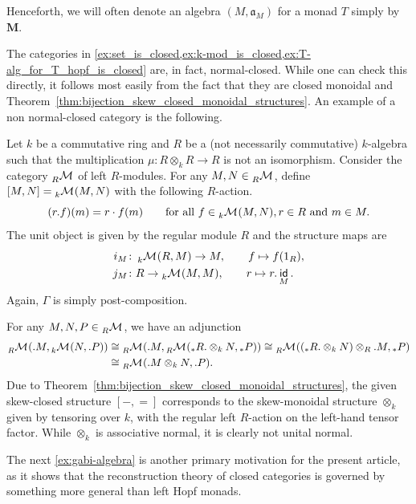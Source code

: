 \documentclass[12pt,dvipsnames,oneside]{amsart}
\theoremstyle{plain}
\theoremstyle{remark}
\theoremstyle{definition}
\DeclareMathOperator{\id}{\mathsf{id}}
\newcommand*{\from}{\colon}
\newcommand*{\blank}{{-}}
\newcommand*{\bblank}{{=}}
\newcommand{\mb}[1]{\boldsymbol{#1}}
\newcommand{\act}{\mathfrak{a}}
\begin{document}
Henceforth, we will often denote an algebra \((M,\act_M)\) for a monad \(T\) simply by \(\mb{M}\).

\smallskip

The categories in \cref{ex:set_is_closed,ex:k-mod_is_closed,ex:T-alg_for_T_hopf_is_closed} are, in fact,  normal-closed.
While one can check this directly, it follows most easily from the fact that they are closed monoidal and Theorem~\ref{thm:bijection_skew_closed_monoidal_structures}.
An example of a non normal-closed category is the following.

\begin{example}
  Let \(k\) be a commutative ring and \(R\) be a (not necessarily commutative) \(k\)-algebra such that the multiplication \(\mu\from R \otimes_k R \to R\) is not an isomorphism.
  Consider the category \(\hmodM[R]\) of left \(R\)-modules. For any \(M,N\in \hmodM[R]\), define \([M,N]=\hmodM[k](M,N)\) with the following \(R\)-action.
  \[(r.f)(m) = r \cdot f(m) \qquad \text{for all } f\in \hmodM[k](M,N), r\in R \text{ and }m\in M.\]
  The unit object is given by the regular module \(R\) and the structure maps are
  \begin{align*}
    i_M \colon & \hmodM[k](R,M)\to M, \qquad f \mapsto f(1_R), \\
    j_M\colon & R\to \hmodM[k](M,M), \qquad r \mapsto r.\id_{M}.
  \end{align*}
  Again, \(\Gamma\) is simply post-composition.

  For any \(M, N, P \in \hmodM[R]\), we have an adjunction
  \begin{align*}
    \hmodM[R](.M,\hmodM[k](N,.P))
    & \cong \hmodM[R](.M,\hmodM[R](_{*}R. \otimes_{k} N, {_{*}P}))
      \cong \hmodM[R](({_{*}R}. \otimes_{k} N) \otimes_{R} .M, {_{*}P}) \\
    & \cong \hmodM[R](.M \otimes_{k} N,.P).
  \end{align*}
  Due to Theorem~\ref{thm:bijection_skew_closed_monoidal_structures}, the given skew-closed structure \([\blank,\bblank]\) corresponds to the skew-monoidal structure \(\otimes_{k}\) given by tensoring over \(k\), with the regular left \(R\)-action on the left-hand tensor factor.
  While \(\otimes_{k}\) is associative normal, it is clearly not unital normal.
\end{example}

The next \cref{ex:gabi-algebra} is another primary motivation for the present article, as it shows that the reconstruction theory of closed categories is governed by something more general than left Hopf monads.
\end{document}
